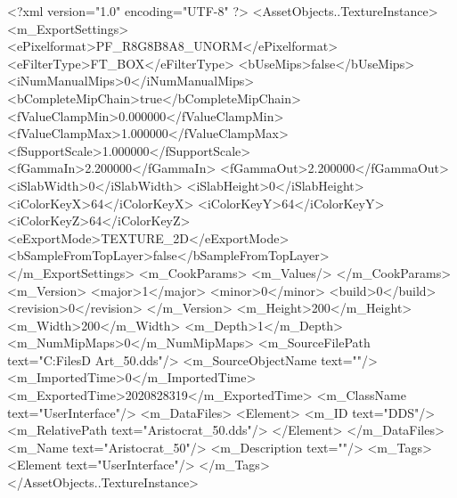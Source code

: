 <?xml version="1.0" encoding="UTF-8" ?>
<AssetObjects..TextureInstance>
	<m_ExportSettings>
		<ePixelformat>PF_R8G8B8A8_UNORM</ePixelformat>
		<eFilterType>FT_BOX</eFilterType>
		<bUseMips>false</bUseMips>
		<iNumManualMips>0</iNumManualMips>
		<bCompleteMipChain>true</bCompleteMipChain>
		<fValueClampMin>0.000000</fValueClampMin>
		<fValueClampMax>1.000000</fValueClampMax>
		<fSupportScale>1.000000</fSupportScale>
		<fGammaIn>2.200000</fGammaIn>
		<fGammaOut>2.200000</fGammaOut>
		<iSlabWidth>0</iSlabWidth>
		<iSlabHeight>0</iSlabHeight>
		<iColorKeyX>64</iColorKeyX>
		<iColorKeyY>64</iColorKeyY>
		<iColorKeyZ>64</iColorKeyZ>
		<eExportMode>TEXTURE_2D</eExportMode>
		<bSampleFromTopLayer>false</bSampleFromTopLayer>
	</m_ExportSettings>
	<m_CookParams>
		<m_Values/>
	</m_CookParams>
	<m_Version>
		<major>1</major>
		<minor>0</minor>
		<build>0</build>
		<revision>0</revision>
	</m_Version>
	<m_Height>200</m_Height>
	<m_Width>200</m_Width>
	<m_Depth>1</m_Depth>
	<m_NumMipMaps>0</m_NumMipMaps>
	<m_SourceFilePath text="C:\Users\Shadow\Desktop\Working Files\2D Art\Quarters\Aristocrat\Aristocrat_50.dds"/>
	<m_SourceObjectName text=""/>
	<m_ImportedTime>0</m_ImportedTime>
	<m_ExportedTime>2020828319</m_ExportedTime>
	<m_ClassName text="UserInterface"/>
	<m_DataFiles>
		<Element>
			<m_ID text="DDS"/>
			<m_RelativePath text="Aristocrat_50.dds"/>
		</Element>
	</m_DataFiles>
	<m_Name text="Aristocrat_50"/>
	<m_Description text=""/>
	<m_Tags>
		<Element text="UserInterface"/>
	</m_Tags>
</AssetObjects..TextureInstance>


